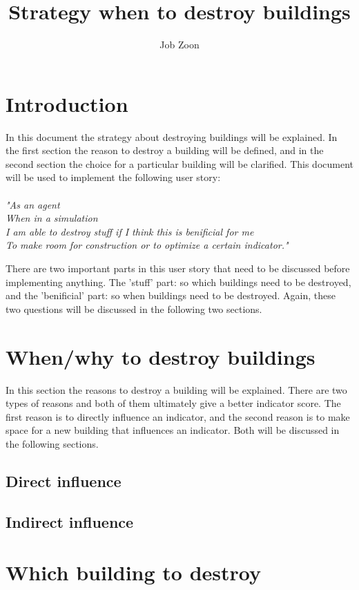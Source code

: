 \documentclass{article}
\author{Job Zoon}
\title{Strategy when to destroy buildings}
\begin{document}

\maketitle{}
\newpage{}

\section{Introduction}
In this document the strategy about destroying buildings will be explained. In the first section the reason to destroy a building will be defined, and in the second section the choice for a particular building will be clarified. This document will be used to implement the following user story:\\
\\
\textit{"As an agent\\
When in a simulation\\
I am able to destroy stuff if I think 
this is benificial for me\\
To make room for construction or to 
optimize a certain indicator."\\}

There are two important parts in this user story that need to be discussed before implementing anything. The 'stuff' part: so which buildings need to be destroyed, and the 'benificial' part: so when buildings need to be destroyed. Again, these two questions will be discussed in the following two sections.

\section{When/why to destroy buildings}
In this section the reasons to destroy a building will be explained. There are two types of reasons and both of them ultimately give a better indicator score. The first reason is to directly influence an indicator, and the second reason is to make space for a new building that influences an indicator. Both will be discussed in the following sections.

\subsection{Direct influence}

\subsection{Indirect influence}

\section{Which building to destroy}
\end{document}
